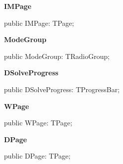\documentclass{report}
\newif\ifpdf
\begin{document}
\begin{list}{}
\begin{flushleft}
\ifpdf
\end{flushleft}
\fi


\par  \label{igobase.TIWizFrm-IMPage}
\item[\textbf{IMPage}\hfill]
\ifpdf
\begin{flushleft}
\fi
\begin{ttfamily}
public IMPage: TPage;\end{ttfamily}

\ifpdf
\end{flushleft}
\fi


\par  \label{igobase.TIWizFrm-ModeGroup}
\item[\textbf{ModeGroup}\hfill]
\ifpdf
\begin{flushleft}
\fi
\begin{ttfamily}
public ModeGroup: TRadioGroup;\end{ttfamily}

\ifpdf
\end{flushleft}
\fi


\par  \label{igobase.TIWizFrm-DSolveProgress}
\item[\textbf{DSolveProgress}\hfill]
\ifpdf
\begin{flushleft}
\fi
\begin{ttfamily}
public DSolveProgress: TProgressBar;\end{ttfamily}

\ifpdf
\end{flushleft}
\fi


\par  \label{igobase.TIWizFrm-WPage}
\item[\textbf{WPage}\hfill]
\ifpdf
\begin{flushleft}
\fi
\begin{ttfamily}
public WPage: TPage;\end{ttfamily}

\ifpdf
\end{flushleft}
\fi


\par  \label{igobase.TIWizFrm-DPage}
\item[\textbf{DPage}\hfill]
\ifpdf
\begin{flushleft}
\fi
\begin{ttfamily}
public DPage: TPage;\end{ttfamily}


\end{flushleft}
\end{list}
\end{document}
